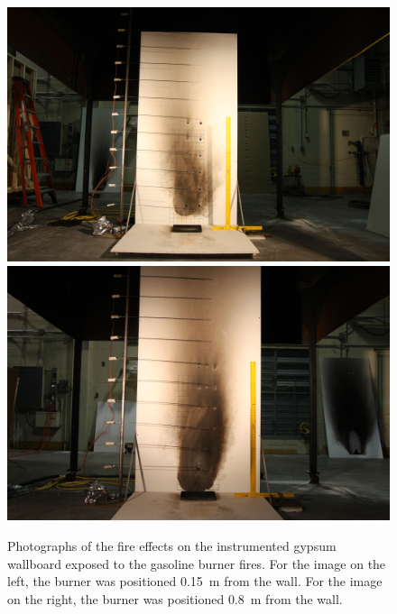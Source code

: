 \documentclass[twoside]{uocthesis}
\begin{document}
\begin{figure}[p]
	\centering
	\includegraphics[trim=18.0in 4.0in 21.0in 14.0in, clip=true, width=0.4\columnwidth]{../Figures/IWGB_Gas_0_15_pattern}
	\includegraphics[trim=18.0in 2.6in 18.0in 11.7in, clip=true, width=0.4\columnwidth]{../Figures/IWGB_Gas7_0_8m} \\
	\caption[Photographs of the fire effects on the instrumented gypsum wallboard exposed to the gasoline burner fires]{Photographs of the fire effects on the instrumented gypsum wallboard exposed to the gasoline burner fires. For the image on the left, the burner was positioned 0.15~m from the wall.  For the image on the right, the burner was positioned 0.8~m from the wall.}
	\label{IWGB_Gas_patterns}
\end{figure}
\end{document}
